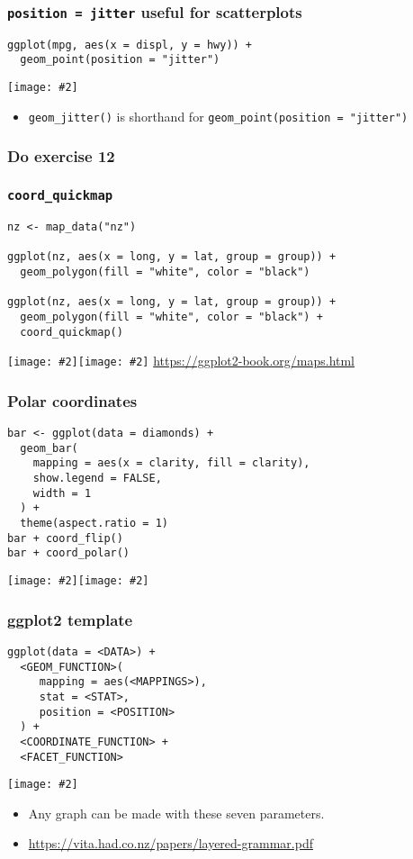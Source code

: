 \documentclass{beamer}
\newcommand{\bi}{\begin{itemize}}
\newcommand{\li}{\item}
\newcommand{\ei}{\end{itemize}}
\newcommand{\fig}[2]{\centerline{\texttt{[image: \#2]}}}
\newcommand{\figg}[2]{\texttt{[image: \#2]}}
\newcommand{\bfr}[1]{\begin{frame}[fragile]\frametitle{{ #1 }}}
\begin{document}
\bfr{{\tt position = jitter} useful for scatterplots}\scriptsize
\begin{verbatim}
ggplot(mpg, aes(x = displ, y = hwy)) + 
  geom_point(position = "jitter")
\end{verbatim}
\fig{.8}{unnamed-chunk-39-1.png}
\bi
\li \verb|geom_jitter()| is shorthand for \verb|geom_point(position = "jitter")|
\ei
\end{frame}

\bfr{Do exercise 12}
\end{frame}

\bfr{\tt coord\_quickmap}\scriptsize
\begin{verbatim}
nz <- map_data("nz")

ggplot(nz, aes(x = long, y = lat, group = group)) +
  geom_polygon(fill = "white", color = "black")

ggplot(nz, aes(x = long, y = lat, group = group)) +
  geom_polygon(fill = "white", color = "black") +
  coord_quickmap()
\end{verbatim}
\figg{.5}{unnamed-chunk-42-1.png}\figg{.5}{unnamed-chunk-42-2.png}
\vfill
\url{https://ggplot2-book.org/maps.html}
\end{frame}


\bfr{Polar coordinates}\scriptsize
\begin{verbatim}
bar <- ggplot(data = diamonds) + 
  geom_bar(
    mapping = aes(x = clarity, fill = clarity), 
    show.legend = FALSE,
    width = 1
  ) + 
  theme(aspect.ratio = 1)
bar + coord_flip()
bar + coord_polar()
\end{verbatim}
\figg{.45}{unnamed-chunk-43-1.png}\figg{.45}{unnamed-chunk-43-2.png}
\end{frame}


\bfr{ggplot2 template}\scriptsize
\begin{verbatim}
ggplot(data = <DATA>) + 
  <GEOM_FUNCTION>(
     mapping = aes(<MAPPINGS>),
     stat = <STAT>, 
     position = <POSITION>
  ) +
  <COORDINATE_FUNCTION> +
  <FACET_FUNCTION>
\end{verbatim}
\fig{1.1}{visualization-grammar.png}
\bi
\li Any graph can be made with these seven parameters.
\li \url{https://vita.had.co.nz/papers/layered-grammar.pdf}
\ei
\end{frame}
\end{document}
